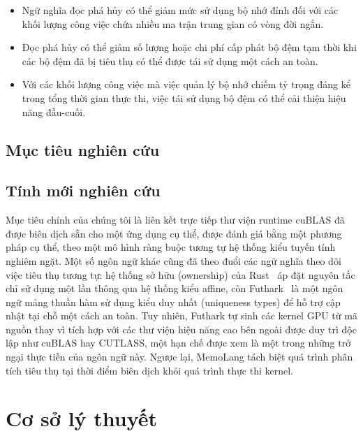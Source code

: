 \documentclass[a4paper]{article}
\begin{document}
	\begin{itemize}
	\item Ngữ nghĩa đọc phá hủy có thể giảm mức sử dụng bộ nhớ đỉnh đối với các khối lượng công việc chứa nhiều ma trận trung gian có vòng đời ngắn.
	\item Đọc phá hủy có thể giảm số lượng hoặc chi phí cấp phát bộ đệm tạm thời khi các bộ đệm đã bị tiêu thụ có thể được tái sử dụng một cách an toàn.
	\item Với các khối lượng công việc mà việc quản lý bộ nhớ chiếm tỷ trọng đáng kể trong tổng thời gian thực thi, việc tái sử dụng bộ đệm có thể cải thiện hiệu năng đầu-cuối.
	\end{itemize}
	
	\subsection{Mục tiêu nghiên cứu}
	
	
	\subsection{Tính mới nghiên cứu}
	
	Mục tiêu chính của chúng tôi là liên kết trực tiếp thư viện runtime cuBLAS đã được biên dịch sẵn cho một ứng dụng cụ thể, được đánh giá bằng một phương pháp cụ thể, theo một mô hình ràng buộc tương tự hệ thống kiểu tuyến tính nghiêm ngặt. Một số ngôn ngữ khác cũng đã theo đuổi các ngữ nghĩa theo dõi việc tiêu thụ tương tự: hệ thống sở hữu (ownership) của Rust~\cite{rust} áp đặt nguyên tắc chỉ sử dụng một lần thông qua hệ thống kiểu affine, còn Futhark~\cite{futhark} là một ngôn ngữ mảng thuần hàm sử dụng kiểu duy nhất (uniqueness types) để hỗ trợ cập nhật tại chỗ một cách an toàn. Tuy nhiên, Futhark tự sinh các kernel GPU từ mã nguồn thay vì tích hợp với các thư viện hiệu năng cao bên ngoài được duy trì độc lập như cuBLAS hay CUTLASS, một hạn chế được xem là một trong những trở ngại thực tiễn của ngôn ngữ này. Ngược lại, MemoLang tách biệt quá trình phân tích tiêu thụ tại thời điểm biên dịch khỏi quá trình thực thi kernel.
	
	\section{Cơ sở lý thuyết}
	
	
\end{document}
